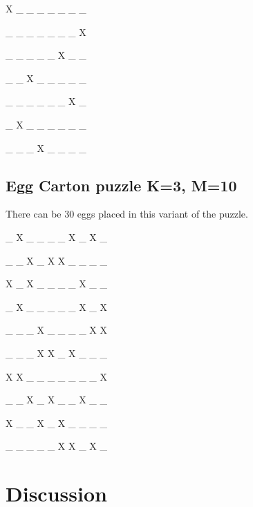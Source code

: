 \documentclass{article}
\begin{document}
X \_ \_ \_ \_ \_ \_ \_ 

\_ \_ \_ \_ \_ \_ \_ X 

\_ \_ \_ \_ \_ X \_ \_ 

\_ \_ X \_ \_ \_ \_ \_ 

\_ \_ \_ \_ \_ \_ X \_ 

\_ X \_ \_ \_ \_ \_ \_ 

\_ \_ \_ X \_ \_ \_ \_ 

\subsection{Egg Carton puzzle K=3, M=10}

There can be 30 eggs placed in this variant of the puzzle. 

\_ X \_ \_ \_ \_ X \_ X \_ 

\_ \_ X \_ X X \_ \_ \_ \_ 

X \_ X \_ \_ \_ \_ X \_ \_ 

\_ X \_ \_ \_ \_ \_ X \_ X 

\_ \_ \_ X \_ \_ \_ \_ X X 

\_ \_ \_ X X \_ X \_ \_ \_ 

X X \_ \_ \_ \_ \_ \_ \_ X 

\_ \_ X \_ X \_ \_ X \_ \_ 

X \_ \_ X \_ X \_ \_ \_ \_ 

\_ \_ \_ \_ \_ X X \_ X \_ 

\section{Discussion}
\end{document}
